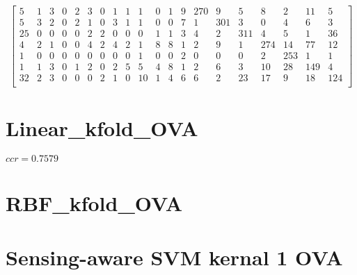 \documentclass[a4paper, 11pt]{article}
\begin{document}
\[\begin{bmatrix}
     5  &   1  &   3  &   0   &  2  &   3 &    0  &   1  &   1  &   1  &   0 &    1  &   9  & 270  &   9  &   5  &   8  &   2  &  11  &   5 \\
     5  &   3  &   2  &   0   &  2  &   1 &    0  &   3  &   1  &   1  &   0 &    0  &   7  &   1  & 301  &   3  &   0  &   4  &   6  &   3 \\
    25  &   0  &   0  &   0   &  0  &   2 &    2  &   0  &   0  &   0  &   1 &    1  &   3  &   4  &   2  & 311  &   4  &   5  &   1  &  36 \\
     4  &   2  &   1  &   0   &  0  &   4 &    2  &   4  &   2  &   1  &   8 &    8  &   1  &   2  &   9  &   1  & 274  &  14  &  77  &  12 \\
     1  &   0  &   0  &   0   &  0  &   0 &    0  &   0  &   0  &   1  &   0 &    0  &   2  &   0  &   0  &   0  &   2  & 253  &   1  &   1 \\
     1  &   1  &   3  &   0   &  1  &   2 &    0  &   2  &   5  &   5  &   4 &    8  &   1  &   2  &   6  &   3  &  10  &  28  & 149  &   4 \\
    32  &   2  &   3  &   0   &  0  &   0 &    2  &   1  &   0  &  10  &   1 &    4  &   6  &   6  &   2  &  23  &  17  &   9  &  18  & 124 \\
\end{bmatrix}\]
\section{Linear_kfold_OVA}
\label{code:Linear_kfold_OVA}
$ccr=0.7579$

\section{RBF_kfold_OVA}
\section{Sensing-aware SVM kernal 1 OVA}
\end{document}

